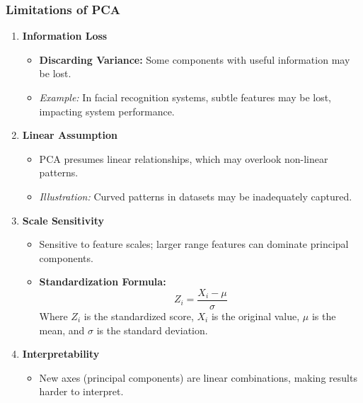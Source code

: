\documentclass[aspectratio=169]{beamer}
\begin{document}
\begin{frame}[fragile]
    \frametitle{Limitations of PCA}
    \begin{enumerate}
        \item \textbf{Information Loss}
            \begin{itemize}
                \item \textbf{Discarding Variance:} Some components with useful information may be lost.
                \item \textit{Example:} In facial recognition systems, subtle features may be lost, impacting system performance.
            \end{itemize}

        \item \textbf{Linear Assumption}
            \begin{itemize}
                \item PCA presumes linear relationships, which may overlook non-linear patterns.
                \item \textit{Illustration:} Curved patterns in datasets may be inadequately captured.
            \end{itemize}

        \item \textbf{Scale Sensitivity}
            \begin{itemize}
                \item Sensitive to feature scales; larger range features can dominate principal components.
                \item \textbf{Standardization Formula:}
                \begin{equation}
                    Z_i = \frac{X_i - \mu}{\sigma}
                \end{equation}
                Where \(Z_i\) is the standardized score, \(X_i\) is the original value, \(\mu\) is the mean, and \(\sigma\) is the standard deviation.
            \end{itemize}

        \item \textbf{Interpretability}
            \begin{itemize}
                \item New axes (principal components) are linear combinations, making results harder to interpret.
            \end{itemize}
    \end{enumerate}
\end{frame}
\end{document}
